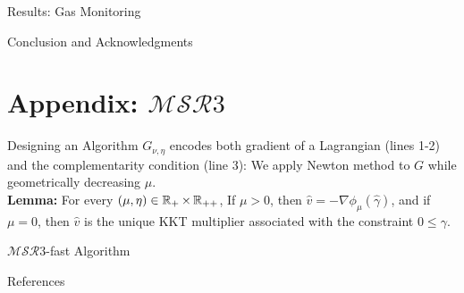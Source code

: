 \documentclass[8pt]{beamer}
\newcommand{\ouralgo}{\ensuremath{\mathcal{MSR}3}}
\begin{document}

\begin{frame}{Results: Gas Monitoring}
	
\end{frame}


\begin{frame}{Conclusion and Acknowledgments}

\end{frame}

\appendix
\section{Appendix: $\mathcal{MSR}3$}
\begin{frame}{Designing an Algorithm}
	$G_{\nu,\eta}$ encodes both gradient of a Lagrangian (lines 1-2) and the complementarity condition (line 3):
	We apply Newton method to $G$ while geometrically decreasing $\mu$. \\
\textbf{Lemma:} For every $(\mu,\eta) \in \operatorname{\mathbb{R}}_+\times\operatorname{\mathbb{R}}_{++}$,
If $\mu > 0$, then $\hat{v} = -\nabla\phi_\mu(\hat{\gamma})$, and if $\mu = 0$, then $\hat{v}$ is the unique KKT multiplier associated with the constraint $0 \leq \gamma$.
\end{frame}

\begin{frame}{$\ouralgo$-fast Algorithm}

\end{frame}

\begin{frame}{References}
    \printbibliography[heading=none]
\end{frame}
\end{document}
